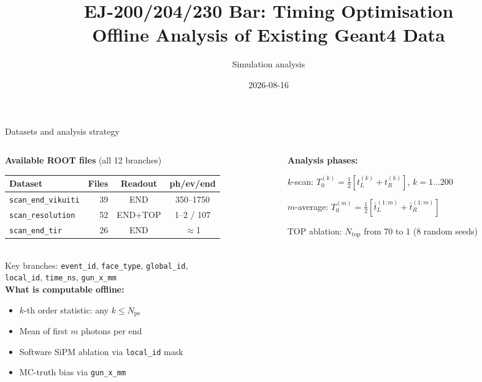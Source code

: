 \documentclass[xcolor=table,aspectratio=169,9pt]{beamer}
\title[Bar Timing Optimisation]{EJ-200/204/230 Bar: Timing Optimisation\\Offline Analysis of Existing Geant4 Data}
\author{Simulation analysis}
\date{2026-08-16}
\begin{document}
\begin{frame}
\titlepage
\end{frame}

\begin{frame}{Datasets and analysis strategy}
\begin{columns}[T]
\begin{column}{0.48\textwidth}
\textbf{Available ROOT files} (all 12 branches)\\
\footnotesize
\begin{tabular}{lrcc}
\toprule
Dataset & Files & Readout & ph/ev/end\\
\midrule
\texttt{scan\_end\_vikuiti} & 39 & END & 350--1750\\
\texttt{scan\_resolution} & 52 & END+TOP & 1--2 / 107\\
\texttt{scan\_end\_tir} & 26 & END & $\approx$1\\
\bottomrule
\end{tabular}\\[0.4em]
\normalsize
Key branches: \texttt{event\_id}, \texttt{face\_type}, \texttt{global\_id},\\
\texttt{local\_id}, \texttt{time\_ns}, \texttt{gun\_x\_mm}\\[0.4em]
\textbf{What is computable offline:}
\begin{itemize}\footnotesize
  \item $k$-th order statistic: any $k \le N_\mathrm{pe}$
  \item Mean of first $m$ photons per end
  \item Software SiPM ablation via \texttt{local\_id} mask
  \item MC-truth bias via \texttt{gun\_x\_mm}
\end{itemize}
\end{column}
\begin{column}{0.48\textwidth}
\textbf{Analysis phases:}\\[0.3em]
\begin{description}\footnotesize
  \item[Phase A] $k$-scan: $T_0^{(k)}=\tfrac{1}{2}[t_L^{(k)}+t_R^{(k)}]$, $k=1\ldots200$
  \item[Phase B] $m$-average: $T_0^{(m)}=\tfrac{1}{2}[\bar{t}_L^{(1:m)}+\bar{t}_R^{(1:m)}]$
  \item[Phase C] TOP ablation: $N_\mathrm{top}$ from 70 to 1 (8 random seeds)

\end{description}
\end{column}
\end{columns}
\end{frame}
\end{document}
